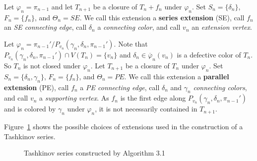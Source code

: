\documentclass[11pt]{article}
\newcommand{\phibar}{\overline{\varphi}}
\newcommand{\phiv}{\varphi}
\begin{document}
\vskip 2mm
\label{SEextension} Let $\phiv_n = \pi_{n-1}$ and let $T_{n+1}$ be a closure of $T_n+f_n$ under $\phiv_{n}$. Set $S_n= \{ \delta_n \}$,  $F_n=\{f_n\}$, and 
$\Theta_n = SE$. We call this extension a {\bf series extension} (SE), call $f_n$ an {\em SE connecting edge}, call $\delta_n$ a {\em connecting 
	color}, and call $v_n$ an {\em extension vertex}\label{extensionvertex}.

\vskip 2mm
\label{PEextension}  Let $\phiv_n  = \pi_{n-1}'/ P_{v_n}(\gamma_n, \delta_n, \pi_{n-1}')$. Note that $P_{v_n}(\gamma_n, \delta_n, \pi_{n-1}')\cap V(T_n)=\{v_n\}$ 
and $\delta_n\in\phibar_n(v_n)$ is a defective color of $T_n$. So $T_n$ is not closed under $\varphi_n$. Let $T_{n+1}$ be a closure of $T_n$ under $\phiv_n$. Set $S_n = \{\delta_n, \gamma_n\}$, $F_n=\{f_n\}$, and $\Theta_n =PE$. We call this extension a {\bf parallel extension} (PE), call $f_n$ a {\em PE 
connecting edge}, call $\delta_n$ and $\gamma_n$ {\em connecting colors}, and call $v_n$ a {\em supporting vertex}\label{supportingvertex}. As 
$f_n$ is the first edge along $P_{v_n}(\gamma_n, \delta_n, \pi_{n-1}')$ and is colored by $\gamma_n$ under $\varphi_n$, 
it is not necessarily contained in $T_{n+1}$.

\vskip 3mm
Figure~\ref{abc} shows the possible choices of extensions used in the construction of a Tashkinov series.
\begin{figure}[htpb]
\vspace{-1mm}
\centering
{}
\vspace{-1mm}\caption{Tashkinov series constructed by Algorithm 3.1}
\label{abc}
\end{figure}
\vspace{-3mm}
\end{document}

